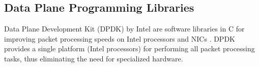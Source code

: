 %
%
%

\subsection{Data Plane Programming Libraries}
\label{rel:odp}

Data Plane Development Kit (DPDK) by Intel are software libraries in C for improving packet processing speeds on Intel processors and NICs \cite{dpdk_webpage}. DPDK provides a single platform (Intel processors) for performing all packet processing tasks, thus eliminating the need for specialized hardware.

